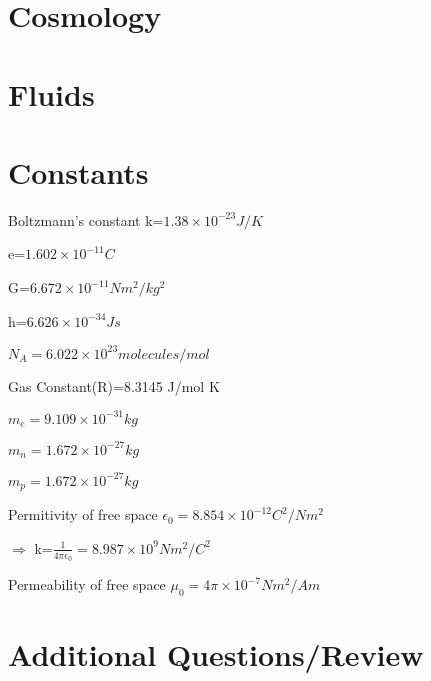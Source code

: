 \documentclass{article}
\begin{document}
\section{Cosmology}









\section{Fluids}









\section{Constants}
Boltzmann's constant k=$1.38\times10^{-23} J/K$

e=$1.602\times10^{-11}C$

G=$6.672\times10^{-11}Nm^2/kg^2$

h=$6.626\times10^{-34}Js$

$N_A=6.022\times10^{23}molecules/mol$

Gas Constant(R)=8.3145 J/mol K

$m_e=9.109\times10^{-31}kg$

$m_n=1.672\times10^{-27}kg$

$m_p=1.672\times10^{-27}kg$

Permitivity of free space $\epsilon_0=8.854\times10^{-12}C^2/N m^2$

$\Rightarrow$ k=$\frac{1}{4\pi \epsilon_0}=8.987\times10^{9} Nm^2/C^2$

Permeability of free space $\mu_0=4\pi \times10^{-7}Nm^2/A m$










\section{Additional Questions/Review}
\end{document}
